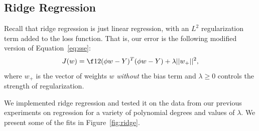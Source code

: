 \documentclass{article}
\begin{document}
\begin{multicols}{2}



\section{Ridge Regression}

Recall that ridge regression is just linear regression, with an $L^2$ regularization term added to the loss function. That is, our error is the following modified version of Equation~\ref{eq:sse}:
\begin{equation}
J(w) = \f12 (\phi w - Y)^T (\phi w - Y) + \lambda ||w_+||^2,
\end{equation}
where $w_+$ is the vector of weights $w$ \emph{without} the bias term and $\lambda\ge 0$ controls the strength of regularization.

We implemented ridge regression and tested it on the data from our previous experiments on regression for a variety of polynomial degrees and values of $\lambda$. We present some of the fits in Figure~\ref{fig:ridge}.


\end{multicols}
\end{document}
